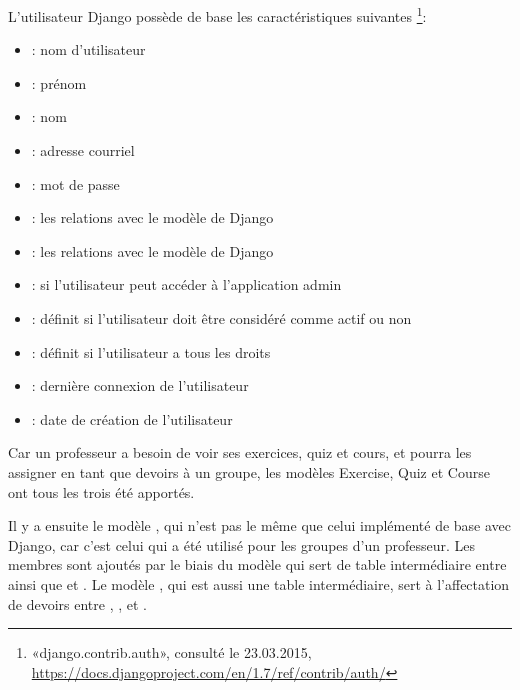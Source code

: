 \documentclass[a4paper,10pt,french]{sphinxmanual}
\begin{document}
L'utilisateur Django possède de base les caractéristiques suivantes \footnote{
«django.contrib.auth»,
consulté le 23.03.2015,
\href{https://docs.djangoproject.com/en/1.7/ref/contrib/auth/}{https://docs.djangoproject.com/en/1.7/ref/contrib/auth/}
}:
\begin{itemize}
\item {} 
: nom d'utilisateur

\item {} 
: prénom

\item {} 
: nom

\item {} 
: adresse courriel

\item {} 
: mot de passe

\item {} 
: les relations avec le modèle  de Django

\item {} 
: les relations avec le modèle  de Django

\item {} 
: si l'utilisateur peut accéder à l'application admin

\item {} 
: définit si l'utilisateur doit être considéré comme actif ou
non

\item {} 
: définit si l'utilisateur a tous les droits

\item {} 
: dernière connexion de l'utilisateur

\item {} 
: date de création de l'utilisateur

\end{itemize}

Car un professeur a besoin de voir ses exercices, quiz et cours, et pourra les
assigner en tant que devoirs à un groupe, les modèles Exercise, Quiz et Course
ont tous les trois été apportés.

Il y a ensuite le modèle , qui n'est pas le même que celui implémenté
de base avec Django, car c'est celui qui a été utilisé pour les groupes d'un
professeur. Les membres sont ajoutés par le biais du modèle 
qui sert de table intermédiaire entre  ainsi que  et
. Le modèle , qui est aussi une table intermédiaire,
sert à l'affectation de devoirs entre , ,  et
.
\end{document}
